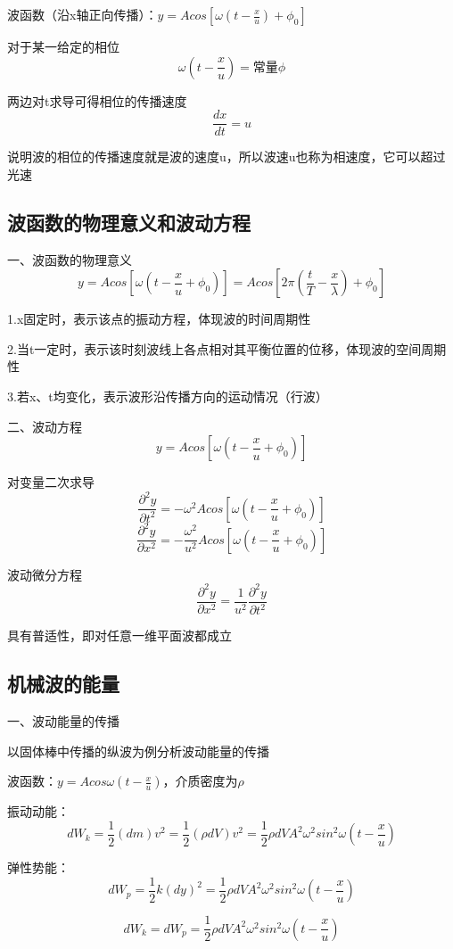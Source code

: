 \documentclass[UTF8]{article}
\begin{document}
    波函数（沿x轴正向传播）：$y = Acos[\omega(t - \frac{x}{u}) + \phi_0]$

    对于某一给定的相位
    \[\omega (t - \frac{x}{u}) = \mbox{常量}\phi\]

    两边对t求导可得相位的传播速度
    \[\frac{dx}{dt} = u\]

    说明波的相位的传播速度就是波的速度u，所以波速u也称为相速度，它可以超过光速

\subsection{波函数的物理意义和波动方程}

    一、波函数的物理意义
    \[y = Acos[\omega(t - \frac{x}{u} + \phi_0)] = Acos[2\pi(\frac{t}{T} - \frac{x}{\lambda}) + \phi_0]\]

    1.x固定时，表示该点的振动方程，体现波的时间周期性

    2.当t一定时，表示该时刻波线上各点相对其平衡位置的位移，体现波的空间周期性

    3.若x、t均变化，表示波形沿传播方向的运动情况（行波）

    二、波动方程
    \[y = Acos[\omega(t - \frac{x}{u} + \phi_0)]\]

    对变量二次求导
    \[\frac{\partial^2y}{\partial t^2} = -\omega^2Acos[\omega(t - \frac{x}{u} + \phi_0)]\]
    \[\frac{\partial^2y}{\partial x^2} = -\frac{\omega^2}{u^2}Acos[\omega(t - \frac{x}{u} + \phi_0)]\]

    波动微分方程
    \[\frac{\partial^2y}{\partial x^2} = \frac{1}{u^2}\frac{\partial^2y}{\partial t^2}\]

    具有普适性，即对任意一维平面波都成立

\subsection{机械波的能量}

    一、波动能量的传播

    以固体棒中传播的纵波为例分析波动能量的传播

    波函数：$y = Acos\omega(t - \frac{x}{u})$，介质密度为$\rho$

    振动动能：
    \[dW_k = \frac{1}{2}(dm)v^2 = \frac{1}{2}(\rho dV)v^2 = \frac{1}{2}\rho dVA^2\omega^2sin^2\omega(t - \frac{x}{u})\]

    弹性势能：
    \[dW_p = \frac{1}{2}k(dy)^2 = \frac{1}{2}\rho dVA^2\omega^2sin^2\omega (t - \frac{x}{u})\]

    \[dW_k = dW_p = \frac{1}{2}\rho dVA^2\omega^2sin^2\omega(t - \frac{x}{u})\]
\end{document}
